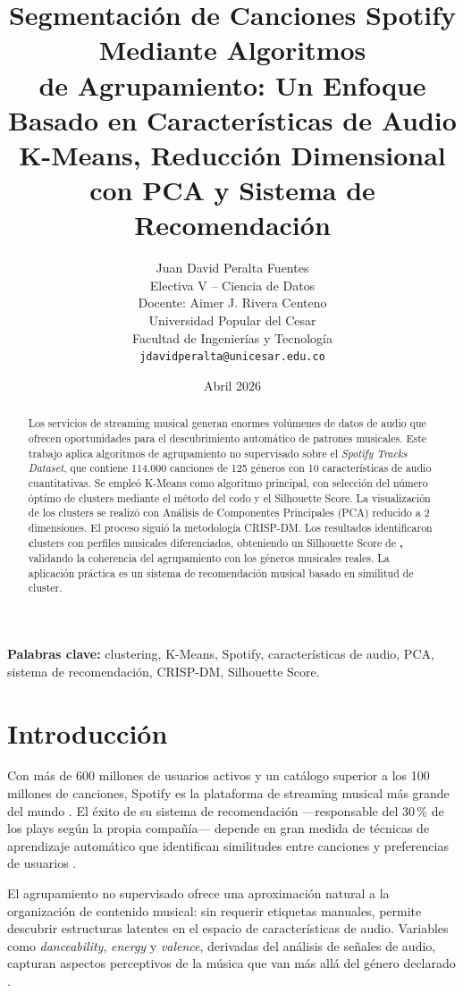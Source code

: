\documentclass[12pt, a4paper]{article}
\title{\textbf{Segmentación de Canciones Spotify Mediante Algoritmos\\
de Agrupamiento: Un Enfoque Basado en Características de Audio}\\[6pt]
\large K-Means, Reducción Dimensional con PCA y Sistema de Recomendación}
\author{Juan David Peralta Fuentes\\
\small Electiva V -- Ciencia de Datos\\
\small Docente: Aimer J. Rivera Centeno\\
\small Universidad Popular del Cesar\\
\small Facultad de Ingenierías y Tecnología\\
\small \texttt{jdavidperalta@unicesar.edu.co}}
\date{Abril 2026}
\begin{document}
\maketitle

\begin{abstract}
Los servicios de streaming musical generan enormes volúmenes de datos de
audio que ofrecen oportunidades para el descubrimiento automático de
patrones musicales. Este trabajo aplica algoritmos de agrupamiento no
supervisado sobre el \textit{Spotify Tracks Dataset}, que contiene 114.000
canciones de 125 géneros con 10 características de audio cuantitativas.
Se empleó K-Means como algoritmo principal, con selección del número óptimo
de clusters mediante el método del codo y el Silhouette Score. La
visualización de los clusters se realizó con Análisis de Componentes
Principales (PCA) reducido a 2 dimensiones. El proceso siguió la
metodología CRISP-DM. Los resultados identificaron \textbf
clusters con perfiles musicales diferenciados, obteniendo un Silhouette
Score de \textbf, validando la coherencia del agrupamiento
con los géneros musicales reales. La aplicación práctica es un sistema
de recomendación musical basado en similitud de cluster.
\end{abstract}

\noindent\textbf{Palabras clave:} clustering, K-Means, Spotify,
características de audio, PCA, sistema de recomendación, CRISP-DM,
Silhouette Score.

\tableofcontents
\newpage

\section{Introducción}

Con más de 600 millones de usuarios activos y un catálogo superior a los
100 millones de canciones, Spotify es la plataforma de streaming musical
más grande del mundo \cite{spotify2024stats}. El éxito de su sistema de
recomendación —responsable del 30\,\% de los plays según la propia
compañía— depende en gran medida de técnicas de aprendizaje automático
que identifican similitudes entre canciones y preferencias de usuarios
\cite{schedl2018current}.

El agrupamiento no supervisado ofrece una aproximación natural a la
organización de contenido musical: sin requerir etiquetas manuales,
permite descubrir estructuras latentes en el espacio de características
de audio. Variables como \textit{danceability}, \textit{energy} y
\textit{valence}, derivadas del análisis de señales de audio, capturan
aspectos perceptivos de la música que van más allá del género declarado
\cite{turnbull2008semantic}.
\end{document}
